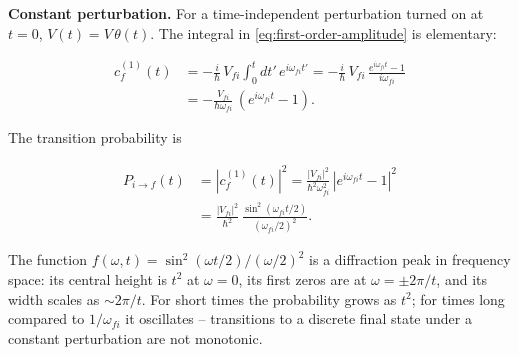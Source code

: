 \medskip\noindent\textbf{Constant perturbation.}
For a time-independent perturbation turned on at $t=0$, $V(t) = V\,\theta(t)$. The integral in \eqref{eq:first-order-amplitude} is elementary:
\begin{linenomath}
\begin{align}
c_{f}^{(1)}(t) &= -\frac{i}{\hbar}\,V_{fi}\int_{0}^{t} dt'\,e^{i\omega_{fi}t'}
= -\frac{i}{\hbar}\,V_{fi}\,\frac{e^{i\omega_{fi}t}-1}{i\omega_{fi}} \nonumber \\
&= -\frac{V_{fi}}{\hbar\omega_{fi}}\,(e^{i\omega_{fi}t}-1).
\end{align}
\end{linenomath}
The transition probability is
\begin{linenomath}
\begin{align}
P_{i\to f}(t) &= |c_{f}^{(1)}(t)|^{2}
= \frac{|V_{fi}|^{2}}{\hbar^{2}\omega_{fi}^{2}}\,
|e^{i\omega_{fi}t}-1|^{2} \nonumber \\
&= \frac{|V_{fi}|^{2}}{\hbar^{2}}\,
\frac{\sin^{2}(\omega_{fi}t/2)}{(\omega_{fi}/2)^{2}}.
\label{eq:constant-perturbation-probability}
\end{align}
\end{linenomath}
The function $f(\omega,t) = \sin^{2}(\omega t/2)/(\omega/2)^{2}$ is a diffraction peak in frequency space: its central height is $t^{2}$ at $\omega=0$, its first zeros are at $\omega = \pm 2\pi/t$, and its width scales as $\sim 2\pi/t$. For short times the probability grows as $t^{2}$; for times long compared to $1/\omega_{fi}$ it oscillates -- transitions to a discrete final state under a constant perturbation are not monotonic.

